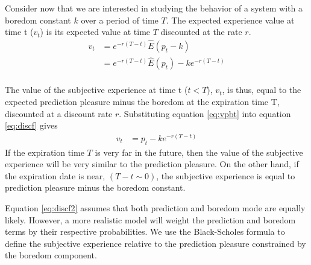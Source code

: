 \documentclass[11pt,twocolumn]{article}
\begin{document}

Consider now that we are interested in studying the behavior of a system with a boredom constant $k$ over a period of time $T$. The expected experience value at time t ($v_t$) is its expected value at time $T$ discounted at the rate $r$.  
\begin{equation}
\begin{split}
    v_t  & =  e^{-r(T-t)}\hat{E}(p_{t} - k)  \\
       & = e^{-r(T-t)}\hat{E}(p_{t}) - k e^{-r(T-t)} \\
\end{split}
\label{eq:discf}
\end{equation}

The value of the subjective experience at time t ($t <T$), $v_t$, is thus, equal to the expected prediction pleasure minus the boredom at the expiration time T, discounted at a discount rate $r$. Substituting equation \ref{eq:vpbt} into equation \ref{eq:discf} gives
\begin{equation}
\begin{split}
    v_t  & =  p_{t} - k e^{-r(T-t)}
\end{split}
\label{eq:discf2}
\end{equation}
If the expiration time $T$ is very far in the future, then the value of the subjective experience will be very similar to the prediction pleasure. On the other hand, if the expiration date is near, $(T-t \sim 0)$, the subjective experience is equal to prediction pleasure minus the boredom constant. 

Equation \ref{eq:discf2} assumes that both prediction and boredom mode are equally likely. However, a more realistic model will weight the prediction and boredom terms by their respective probabilities. We use the Black-Scholes formula to define the subjective experience relative to the prediction pleasure constrained by the boredom component. 
\end{document}
